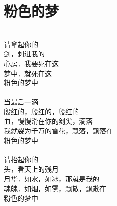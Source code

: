\section{粉色的梦}
\leftskip=25mm
\noindent \\
请拿起你的 \\
剑，刺进我的\\
心房，我要死在这\\
梦中，就死在这\\
粉色的梦中\\
\\
当最后一滴\\
殷红的，殷红的，殷红的\\
血，慢慢滑在你的剑尖，滴落\\
我就裂为千万的雪花，飘落，飘落在\\
粉色的梦中\\
\\
请抬起你的\\
头，看天上的残月\\
月华，如水，如冰，那就是我的\\
魂魄，如烟，如雾，飘散，飘散在\\
粉色的梦中



